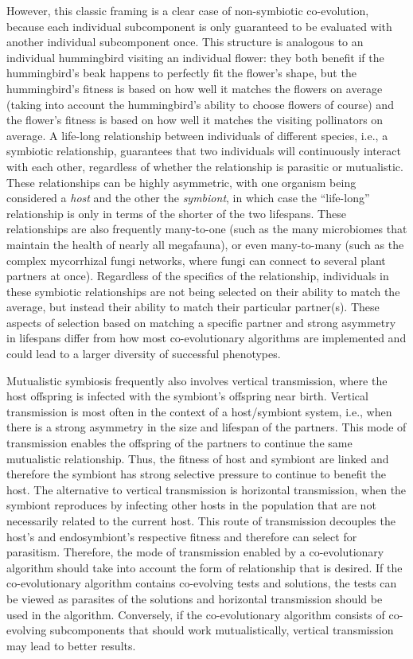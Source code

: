 However, this classic framing is a clear case of non-symbiotic co-evolution, because each individual subcomponent is only guaranteed to be evaluated with another individual subcomponent once.
This structure is analogous to an individual hummingbird visiting an individual flower: they both benefit if the hummingbird's beak happens to perfectly fit the flower's shape, but the hummingbird's fitness is based on how well it matches the flowers on average (taking into account the hummingbird's ability to choose flowers of course) and the flower's fitness is based on how well it matches the visiting pollinators on average.
A life-long relationship between individuals of different species, i.e., a symbiotic relationship, guarantees that two individuals will continuously interact with each other, regardless of whether the relationship is parasitic or mutualistic.
These relationships can be highly asymmetric, with one organism being considered a \textit{host} and the other the \textit{symbiont}, in which case the ``life-long'' relationship is only in terms of the shorter of the two lifespans.
These relationships are also frequently many-to-one (such as the many microbiomes that maintain the health of nearly all megafauna), or even many-to-many (such as the complex mycorrhizal fungi networks, where fungi can connect to several plant partners at once).
Regardless of the specifics of the relationship, individuals in these symbiotic relationships are not being selected on their ability to match the average, but instead their ability to match their particular partner(s).
These aspects of selection based on matching a specific partner and strong asymmetry in lifespans differ from how most co-evolutionary algorithms are implemented and could lead to a larger diversity of successful phenotypes.

Mutualistic symbiosis frequently also involves vertical transmission, where the host offspring is infected with the symbiont's offspring near birth.
Vertical transmission is most often in the context of a host/symbiont system, i.e., when there is a strong asymmetry in the size and lifespan of the partners.
This mode of transmission enables the offspring of the partners to continue the same mutualistic relationship.
Thus, the fitness of host and symbiont are linked and therefore the symbiont has strong selective pressure to continue to benefit the host.
The alternative to vertical transmission is horizontal transmission, when the symbiont reproduces by infecting other hosts in the population that are not necessarily related to the current host.
This route of transmission decouples the host's and endosymbiont's respective fitness and therefore can select for parasitism.
Therefore, the mode of transmission enabled by a co-evolutionary algorithm should take into account the form of relationship that is desired.
If the co-evolutionary algorithm contains co-evolving tests and solutions, the tests can be viewed as parasites of the solutions and horizontal transmission should be used in the algorithm.
Conversely, if the co-evolutionary algorithm consists of co-evolving subcomponents that should work mutualistically, vertical transmission may lead to better results.

